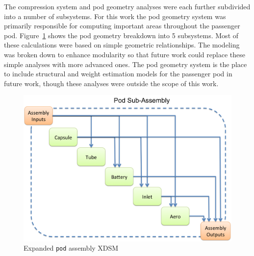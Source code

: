 \documentclass[heading.tex]{subfiles}
\begin{document}
The compression system and pod geometry analyses were each further subdivided into a number of subsystems. For this work the pod geometry 
system was primarily responsible for computing important areas throughout the passenger pod. Figure~\ref{f:podXDSM} shows the 
pod geometry breakdown into 5 subsystems. Most of these calculations were based on simple geometric relationships. The 
modeling was broken down to enhance modularity so that future work could replace these simple analyses with more advanced ones.
The pod geometry system is the place to include structural and weight estimation models for the passenger pod in future work,
though these analyses were outside the scope of this work. 

\begin{figure}[hbtp]
\centering
\includegraphics[width=\textwidth]{images/podAssembly.png}
\caption{Expanded \texttt{pod} assembly XDSM}
\label{f:podXDSM}
\end{figure}
\end{document}
